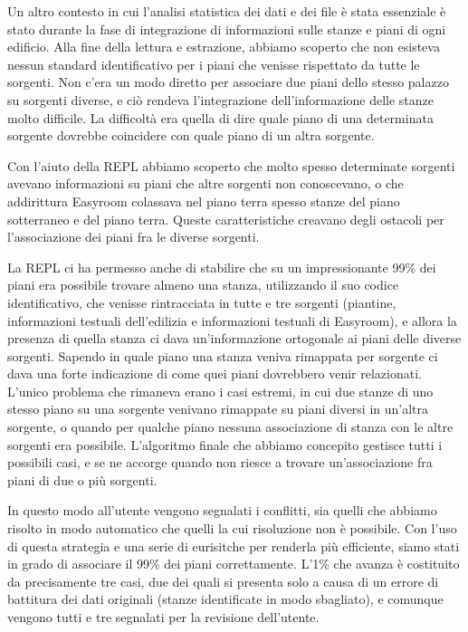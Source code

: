 \documentclass[12pt]{report}
\begin{document}
Un altro contesto in cui l'analisi statistica dei dati e dei file è stata essenziale è stato durante la fase di integrazione di informazioni sulle stanze e piani di ogni edificio. Alla fine della lettura e estrazione, abbiamo scoperto che non esisteva nessun standard identificativo per i piani che venisse rispettato da tutte le sorgenti. Non c'era un modo diretto per associare due piani dello stesso palazzo su sorgenti diverse, e ciò rendeva l'integrazione dell'informazione delle stanze molto difficile. La difficoltà era quella di dire quale piano di una determinata sorgente dovrebbe coincidere con quale piano di un altra sorgente. 

Con l'aiuto della REPL abbiamo scoperto che molto spesso determinate sorgenti avevano informazioni su piani che altre sorgenti non conoscevano, o che addirittura Easyroom colassava nel piano terra spesso stanze del piano sotterraneo e del piano terra. Queste caratteristiche creavano degli ostacoli per l'associazione dei piani fra le diverse sorgenti.

La REPL ci ha permesso anche di stabilire che su un impressionante 99\% dei piani era possibile trovare almeno una stanza, utilizzando il suo codice identificativo, che venisse rintracciata in tutte e tre sorgenti (piantine, informazioni testuali dell'edilizia e informazioni testuali di Easyroom), e allora la presenza di quella stanza ci dava un'informazione ortogonale ai piani delle diverse sorgenti. Sapendo in quale piano una stanza veniva rimappata per sorgente ci dava una forte indicazione di come quei piani dovrebbero venir relazionati. L'unico problema che rimaneva erano i casi estremi, in cui due stanze di uno stesso piano su una sorgente venivano rimappate su piani diversi in un'altra sorgente, o quando per qualche piano nessuna associazione di stanza con le altre sorgenti era possibile. L'algoritmo finale che abbiamo concepito gestisce tutti i possibili casi, e se ne accorge quando non riesce a trovare un'associazione fra piani di due o più sorgenti. 

In questo modo all'utente vengono segnalati i conflitti, sia quelli che abbiamo risolto in modo automatico che quelli la cui risoluzione non è possibile. Con l'uso di questa strategia e una serie di eurisitche per renderla più efficiente, siamo stati in grado di associare il 99\% dei piani correttamente. L'1\% che avanza è costituito da precisamente tre casi, due dei quali si presenta solo a causa di un errore di battitura dei dati originali (stanze identificate in modo sbagliato), e comunque vengono tutti e tre segnalati per la revisione dell'utente. 
\end{document}
